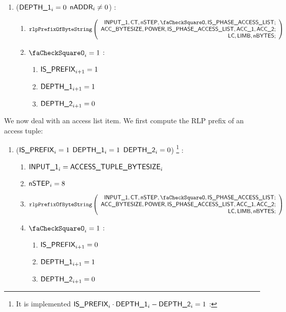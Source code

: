 \begin{enumerate}[resume]
	\item \If ($\textsf{DEPTH\_1}_{i}=0$ \et $\textsf{nADDR}_{i} \ne 0$) \Then:
		\begin{enumerate}
			\item 
				\[
					\rlpPrefixByteString
					\left( \begin{array}{r}
						\Input1,
						\ct,
						\nbstep,
						\done,
						\phaseAccessList{}; \\
						\accsize,
						\Power,
						\phaseAccessList,
						\acc1,
						\acc2; \\
						\lc,
						\limb,
						\limbsize; \\
					\end{array} \right)
				\]
			\item \If $\done_{i}=1$ \Then:
				\begin{enumerate} 
					\item $\textsf{IS\_PREFIX}_{i+1}=1$
					\item $\textsf{DEPTH\_1}_{i+1}=1$
					\item $\textsf{DEPTH\_2}_{i+1}=0$	
				\end{enumerate}
		\end{enumerate}
\end{enumerate}
We now deal with an access list item. We first compute the RLP prefix of an access tuple:
\begin{enumerate}[resume]
	\item \If ($\textsf{IS\_PREFIX}_{i}=1$ \et $\textsf{DEPTH\_1}_{i}=1$ \et $\textsf{DEPTH\_2}_{i}=0$) \footnote{It is implemented \If $\textsf{IS\_PREFIX}_{i} \cdot \textsf{DEPTH\_1}_{i} - \textsf{DEPTH\_2}_{i}=1$ \Then:} \Then:
		\begin{enumerate}
			\item $\textsf{INPUT\_1}_{i} = \textsf{ACCESS\_TUPLE\_BYTESIZE}_{i}$
			\item $\textsf{nSTEP}_{i}=8$
			\item 
				\[
					\rlpPrefixByteString
					\left( \begin{array}{r}
						\Input1,
						\ct,
						\nbstep,
						\done,
						\phaseAccessList{}; \\
						\accsize,
						\Power,
						\phaseAccessList,
						\acc1,
						\acc2; \\
						\lc,
						\limb,
						\limbsize; \\
					\end{array} \right)
				\]
			\item \If $\done_{i}=1$ \Then:
				\begin{enumerate}
					\item $\textsf{IS\_PREFIX}_{i+1}=0$
					\item $\textsf{DEPTH\_1}_{i+1}=1$
					\item $\textsf{DEPTH\_2}_{i+1}=0$ 
				\end{enumerate}
		\end{enumerate}
\end{enumerate}
